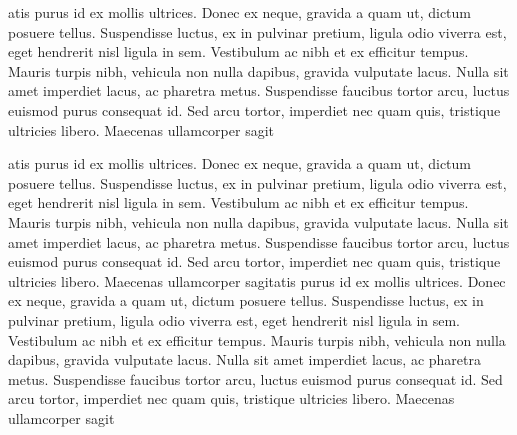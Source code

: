 atis purus id ex mollis ultrices. Donec ex neque, gravida a quam ut, dictum posuere tellus. Suspendisse luctus, ex in pulvinar pretium, ligula odio viverra est, eget hendrerit nisl ligula in sem. Vestibulum ac nibh et ex efficitur tempus. Mauris turpis nibh, vehicula non nulla dapibus, gravida vulputate lacus. Nulla sit amet imperdiet lacus, ac pharetra metus. Suspendisse faucibus tortor arcu, luctus euismod purus consequat id. Sed arcu tortor, imperdiet nec quam quis, tristique ultricies libero. Maecenas ullamcorper sagit


atis purus id ex mollis ultrices. Donec ex neque, gravida a quam ut, dictum posuere tellus. Suspendisse luctus, ex in pulvinar pretium, ligula odio viverra est, eget hendrerit nisl ligula in sem. Vestibulum ac nibh et ex efficitur tempus. Mauris turpis nibh, vehicula non nulla dapibus, gravida vulputate lacus. Nulla sit amet imperdiet lacus, ac pharetra metus. Suspendisse faucibus tortor arcu, luctus euismod purus consequat id. Sed arcu tortor, imperdiet nec quam quis, tristique ultricies libero. Maecenas ullamcorper sagitatis purus id ex mollis ultrices. Donec ex neque, gravida a quam ut, dictum posuere tellus. Suspendisse luctus, ex in pulvinar pretium, ligula odio viverra est, eget hendrerit nisl ligula in sem. Vestibulum ac nibh et ex efficitur tempus. Mauris turpis nibh, vehicula non nulla dapibus, gravida vulputate lacus. Nulla sit amet imperdiet lacus, ac pharetra metus. Suspendisse faucibus tortor arcu, luctus euismod purus consequat id. Sed arcu tortor, imperdiet nec quam quis, tristique ultricies libero. Maecenas ullamcorper sagit